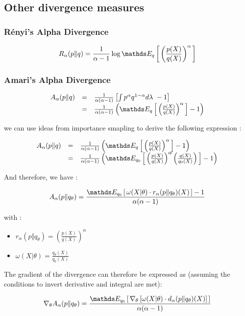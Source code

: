 \subsection{Other divergence measures}

\subsubsection{Rényi's Alpha Divergence}

$$
	R_\alpha(p \Vert q) = \frac 1 {\alpha - 1} \log \esperanceloi q { \left( \frac {p(X)} {q(X)} \right)^\alpha }
$$



\subsubsection{Amari's Alpha Divergence}

$$
	\begin{array}{lcl}
		A_\alpha( p \Vert q ) & = & \frac{1}{\alpha( \alpha - 1 )} \left[ \int p^\alpha q^{1 - \alpha} d\lambda \ -1 \right]
		\\
		                      & = & \frac{1}{\alpha( \alpha - 1 )} \left( \esperanceloi q { \left( \frac {p(X)} {q(X)} \right)^\alpha } - 1\right)
	\end{array}
$$

we can use ideas from importance smapling to derive the following expression :


\[
	\begin{array}{lcl}

		A_\alpha( p \Vert q ) & = & \frac{1}{\alpha( \alpha - 1 )} \left( \esperanceloi q { \left( \frac {p(X)} {q(X)} \right)^\alpha } - 1\right)

		\\
		                      & = & \frac{1}{\alpha( \alpha - 1 )} \left( \esperanceloi {q_0} { \left( \frac {p(X)} {q(X)} \right)^\alpha  \left( \frac{q(X)}{q_0(X)} \right) } - 1\right)
		\\
	\end{array}
\]


And therefore, we have :

$$A_\alpha( p \Vert q_\theta ) = \frac {\esperanceloi {q_0} { \omega(X \vert \theta) \cdot r_\alpha(p \Vert q_\theta )(X) } - 1 }{\alpha ( \alpha - 1 )}$$


with :
\begin{itemize}
    \item $r_\alpha( p \Vert q_\theta ) = \left( \frac {p(X)} {q(X)} \right)^\alpha$
    \item $\omega( X \vert \theta ) = \frac{q_\theta(X)}{q_0(X)}$
\end{itemize}

The gradient of the divergence can therefore be expressed as (assuming the conditions to invert derivative and integral are met):

$$
\nabla_\theta A_\alpha( p \Vert q_\theta ) = 
\frac {
\esperanceloi {q_0} { \nabla_\theta 
\left[\omega(X \vert \theta) \cdot d_\alpha(p \Vert q_\theta )(X)\right] } 
}
{\alpha ( \alpha - 1 )}
$$

